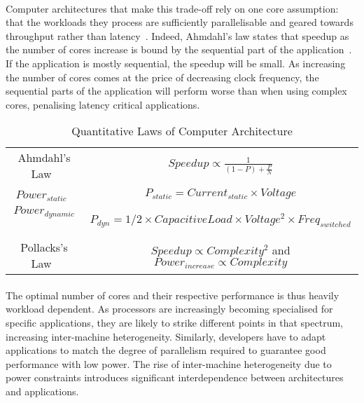 \paragraph{} Computer architectures that make this trade-off rely on one core assumption: that the workloads they process are sufficiently parallelisable and geared towards throughput rather than latency~\cite{FSSP:09}.
Indeed, Ahmdahl's law states that speedup as the number of cores increase
is bound by the sequential part of the application~\cite{4563876}. If the application  is mostly sequential, the speedup will be small. As increasing the number of  cores comes at the price of decreasing clock frequency, the sequential
parts of the application will perform worse than when using complex cores, penalising latency
critical applications. 

\begin{table*}
\begin{center}
\caption{Quantitative Laws of Computer Architecture}
\label{table:quantlaws}
\begin{tabular}{|c|c|}
Ahmdahl's Law~\cite{4563876} & $ Speedup \propto \frac{1}{(1 - P) + \frac{P}{N}} $\\ 
$Power_{static}$~\cite{hennessy2006comparchquantitative} & $P_{static} = Current_{static} \times Voltage$ \\
$Power_{dynamic}$~\cite{hennessy2006comparchquantitative} & $P_{dyn} = 1/2 \times Capacitive Load  \times Voltage^{2} \times Freq_{switched}$\\
Pollacks's Law~\cite{borkar2011future}& $ Speedup \propto Complexity^{2}$ and  $Power_{increase} \propto Complexity$\\
\end{tabular}
\end{center}

\end{table*}

\paragraph{} The optimal number of cores and their respective 
performance is thus heavily workload dependent. As processors are increasingly becoming specialised for specific applications, they are likely to strike different points in that spectrum, 
increasing inter-machine heterogeneity. Similarly,
developers have to adapt applications to match 
the degree of parallelism required to guarantee good performance
with low power. The rise of inter-machine heterogeneity
due to power constraints introduces significant interdependence
between architectures and applications. 

